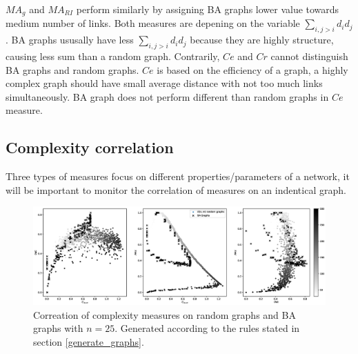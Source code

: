 \documentclass[12pt]{article}
\begin{document}
$MA_g$ and $MA_{RI}$ perform similarly by assigning BA graphs lower value towards medium number of links. Both measures are depening on the variable $\sum_{i,j>i}d_id_j$. BA graphs ususally have less $\sum_{i,j>i}d_id_j$ because they are highly structure, causing less sum than a random graph. Contrarily, $Ce$ and $Cr$ cannot distinguish BA graphs and random graphs. $Ce$ is based on the efficiency of a graph, a highly complex graph should have small average distance with not too much links simultaneously. BA graph does not perform different than random graphs in $Ce$ measure.\\

\subsection{Complexity correlation}
Three types of measures focus on different properties/parameters of a network, it will be important to monitor the correlation of measures on an indentical graph.\\
\begin{figure}[ht]
    \label{fig:correlation}
    \centering
    \includegraphics[width = \textwidth]{complexity_correlation.eps}
    \caption{Correation of complexity measures on random graphs and BA graphs with $n=25$. Generated according to the rules stated in section \ref{generate_graphs}.}
\end{figure}
\end{document}
